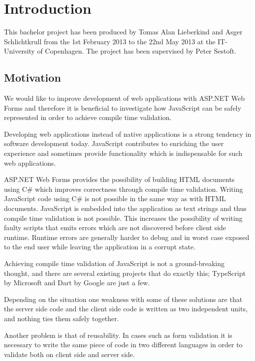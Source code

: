 
\chapter{Introduction} %
\label{cha:introduction}
	This bachelor project has been produced by Tomas Alan Lieberkind and Asger Schlichtkrull from the 1st February 2013 to the 22nd May 2013 at the IT-University of Copenhagen. The project has been supervised by Peter Sestoft.

	\section{Motivation} %
\label{sec:motivation}
	We would like to improve development of web applications with ASP.NET Web Forms and therefore it is beneficial to investigate how JavaScript can be safely represented in order to achieve compile time validation. %

	Developing web applications instead of native applications is a strong tendency in software development today. JavaScript contributes to enriching the user experience and sometimes provide functionality which is indispensable for such web applications.

	ASP.NET Web Forms provides the possibility of building HTML documents using C\# which improves correctness through compile time validation. Writing JavaScript code using C\# is not possible in the same way as with HTML documents. JavaScript is embedded into the application as text strings and thus compile time validation is not possible. This increases the possibility of writing faulty scripts that emits errors which are not discovered before client side runtime. Runtime errors are generally harder to debug and in worst case exposed to the end user while leaving the application in a corrupt state.

	Achieving compile time validation of JavaScript is not a ground-breaking thought, and there are several existing projects that do exactly this; TypeScript by Microsoft and Dart by Google are just a few.

	Depending on the situation one weakness with some of these solutions are that the server side code and the client side code is written as two independent units, and nothing ties them safely together. 

	Another problem is that of reusability. In cases such as form validation it is necessary to write the same piece of code in two different languages in order to validate both on client side and server side.


